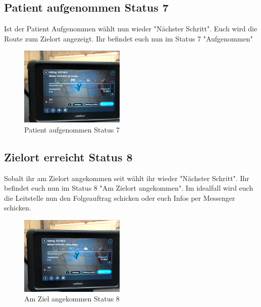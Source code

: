 \documentclass[a4paper,12pt]{scrartcl}
\begin{document}
    \subsection{Patient aufgenommen Status 7}
    Ist der Patient Aufgenommen wählt nun wieder "Nächster Schritt". Euch wird die Route zum Zielort angezeigt.
    Ihr befindet euch nun im Status 7 "Aufgenommen"
    \begin{figure}[h]
        \begin{center}
            \includegraphics[width=5cm]{bilder/aufgenommen.jpg}
            \caption{Patient aufgenommen Status 7}
            \label{Patient aufgenommen}
        \end{center} 
    \end{figure}

    \newpage
    \subsection{Zielort erreicht Status 8}
    Sobalt ihr am Zielort angekommen seit wählt ihr wieder "Nächster Schritt". Ihr befindet euch nun im Status 8 "Am Zielort angekommen".
    Im idealfall wird euch die Leitstelle nun den Folgeauftrag schicken oder euch Infos per Messenger schicken.
    \begin{figure}[h]
        \begin{center}
            \includegraphics[width=5cm]{bilder/angekommen.jpg}
            \caption{Am Ziel angekommen Status 8}
            \label{Ziel}
        \end{center} 
    \end{figure}
\end{document}
